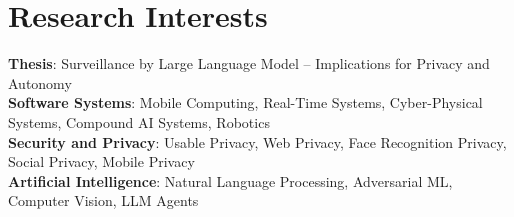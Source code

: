 \section{Research Interests}
 \begin{itemize}[leftmargin=0.5cm, label={}]
    \small{\item{
     \textbf{Thesis}{: Surveillance by Large Language Model -- Implications for Privacy and Autonomy} \\
     \textbf{Software Systems}{: Mobile Computing, Real-Time Systems, Cyber-Physical Systems, Compound AI Systems, Robotics} \\
     \textbf{Security and Privacy}{: Usable Privacy, Web Privacy, Face Recognition Privacy, Social Privacy, Mobile Privacy} \\
     \textbf{Artificial Intelligence}{: Natural Language Processing, Adversarial ML, Computer Vision, LLM Agents} \\
    }}
 \end{itemize}
